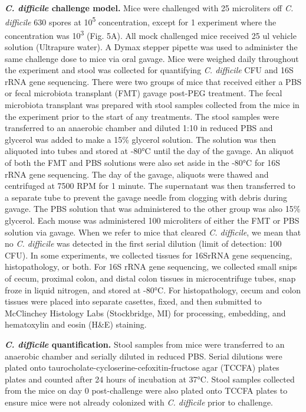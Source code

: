 \documentclass[
  11pt,
]{article}
\begin{document}
\textbf{\emph{C. difficile} challenge model.} Mice were challenged with
25 microliters off \emph{C. difficile} 630 spores at
10\textsuperscript{5} concentration, except for 1 experiment where the
concentration was 10\textsuperscript{3} (Fig. 5A). All mock challenged
mice received 25 ul vehicle solution (Ultrapure water). A Dymax stepper
pipette was used to administer the same challenge dose to mice via oral
gavage. Mice were weighed daily throughout the experiment and stool was
collected for quantifying \emph{C. difficile} CFU and 16S rRNA gene
sequencing. There were two groups of mice that received either a PBS or
fecal microbiota transplant (FMT) gavage post-PEG treatment. The fecal
microbiota transplant was prepared with stool samples collected from the
mice in the experiment prior to the start of any treatments. The stool
samples were transferred to an anaerobic chamber and diluted 1:10 in
reduced PBS and glycerol was added to make a 15\% glycerol solution. The
solution was then aliquoted into tubes and stored at -80°C until the day
of the gavage. An aliquot of both the FMT and PBS solutions were also
set aside in the -80°C for 16S rRNA gene sequencing. The day of the
gavage, aliquots were thawed and centrifuged at 7500 RPM for 1 minute.
The supernatant was then transferred to a separate tube to prevent the
gavage needle from clogging with debris during gavage. The PBS solution
that was administered to the other group was also 15\% glycerol. Each
mouse was administered 100 microliters of either the FMT or PBS solution
via gavage. When we refer to mice that cleared \emph{C. difficile}, we
mean that no \emph{C. difficile} was detected in the first serial
dilution (limit of detection: 100 CFU). In some experiments, we
collected tissues for 16SrRNA gene sequencing, histopathology, or both.
For 16S rRNA gene sequencing, we collected small snips of cecum,
proximal colon, and distal colon tissues in microcentrifuge tubes, snap
froze in liquid nitrogen, and stored at -80°C. For histopathology, cecum
and colon tissues were placed into separate casettes, fixed, and then
submitted to McClinchey Histology Labs (Stockbridge, MI) for processing,
embedding, and hematoxylin and eosin (H\&E) staining.

\textbf{\emph{C. difficile} quantification.} Stool samples from mice
were transferred to an anaerobic chamber and serially diluted in reduced
PBS. Serial dilutions were plated onto
taurocholate-cycloserine-cefoxitin-fructose agar (TCCFA) plates plates
and counted after 24 hours of incubation at 37°C. Stool samples
collected from the mice on day 0 post-challenge were also plated onto
TCCFA plates to ensure mice were not already colonized with \emph{C.
difficile} prior to challenge.
\end{document}
